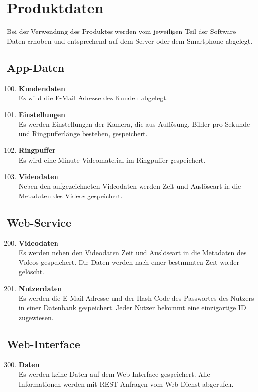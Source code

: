 \chapter{Produktdaten}
Bei der Verwendung des Produktes werden vom jeweiligen Teil der Software Daten erhoben und entsprechend auf dem Server oder dem \gls{Smartphone} abgelegt.
\section{App-Daten}
\begin{enumerate}[\bfseries{PD}10]
	\setcounter{enumi}{99}
\item \textbf{Kundendaten} \hfill \\
Es wird die E-Mail Adresse des Kunden abgelegt.
\item \textbf{Einstellungen} \hfill \\
Es werden Einstellungen der Kamera, die aus Auflösung, Bilder pro Sekunde und \gls{Ringpuffer}länge bestehen, gespeichert.
\item \textbf{\gls{Ringpuffer}} \hfill \\
Es wird eine Minute Videomaterial im \gls{Ringpuffer} gespeichert.
\item \textbf{Videodaten} \hfill \\
Neben den aufgezeichneten Videodaten werden Zeit und Auslöseart in die \gls{Metadaten} des Videos gespeichert.
\end{enumerate}

\section{Web-Service}
\begin{enumerate}[\bfseries{PK}10]
	\setcounter{enumi}{199}
\item \textbf{Videodaten} \hfill \\
Es werden neben den Videodaten Zeit und Auslöseart in die \gls{Metadaten} des Videos gespeichert. Die Daten werden nach einer bestimmten Zeit wieder gelöscht.
\item \textbf{Nutzerdaten} \hfill \\
Es werden die \gls{E-Mail}-Adresse und der \gls{Hash-Code} des Passwortes des Nutzers in einer Datenbank gespeichert. Jeder Nutzer bekommt eine einzigartige ID zugewiesen. 
\end{enumerate}

\section{\gls{Web-Interface}}
\begin{enumerate}[\bfseries{PK}10]
	\setcounter{enumi}{299}
\item \textbf{Daten} \hfill \\
Es werden keine Daten auf dem \gls{Web-Interface} gespeichert. Alle Informationen werden mit REST-Anfragen vom \gls{Web-Dienst} abgerufen.
\end{enumerate}


